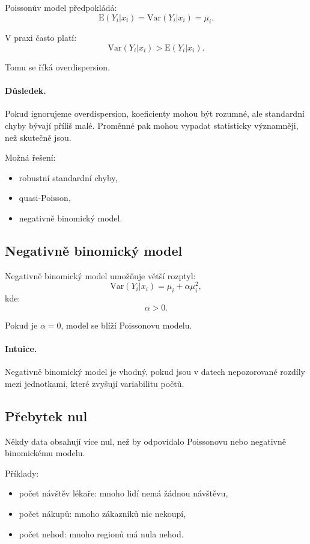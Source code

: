 Poissonův model předpokládá:
\[
\mathrm{E}(Y_i|x_i)=\mathrm{Var}(Y_i|x_i)=\mu_i.
\]

V praxi často platí:
\[
\mathrm{Var}(Y_i|x_i)>\mathrm{E}(Y_i|x_i).
\]

Tomu se říká overdispersion.

\paragraph{Důsledek.}
Pokud ignorujeme overdispersion, koeficienty mohou být rozumné, ale standardní chyby bývají příliš malé.
Proměnné pak mohou vypadat statisticky významněji, než skutečně jsou.

Možná řešení:
\begin{itemize}
    \item robustní standardní chyby,
    \item quasi-Poisson,
    \item negativně binomický model.
\end{itemize}

\subsection{Negativně binomický model}

Negativně binomický model umožňuje větší rozptyl:
\[
\mathrm{Var}(Y_i|x_i)=\mu_i+\alpha\mu_i^2,
\]
kde:
\[
\alpha>0.
\]

Pokud je $\alpha=0$, model se blíží Poissonovu modelu.

\paragraph{Intuice.}
Negativně binomický model je vhodný, pokud jsou v datech nepozorované rozdíly mezi jednotkami, které
zvyšují variabilitu počtů.

\subsection{Přebytek nul}

Někdy data obsahují více nul, než by odpovídalo Poissonovu nebo negativně binomickému modelu.

Příklady:
\begin{itemize}
    \item počet návštěv lékaře: mnoho lidí nemá žádnou návštěvu,
    \item počet nákupů: mnoho zákazníků nic nekoupí,
    \item počet nehod: mnoho regionů má nula nehod.
\end{itemize}

